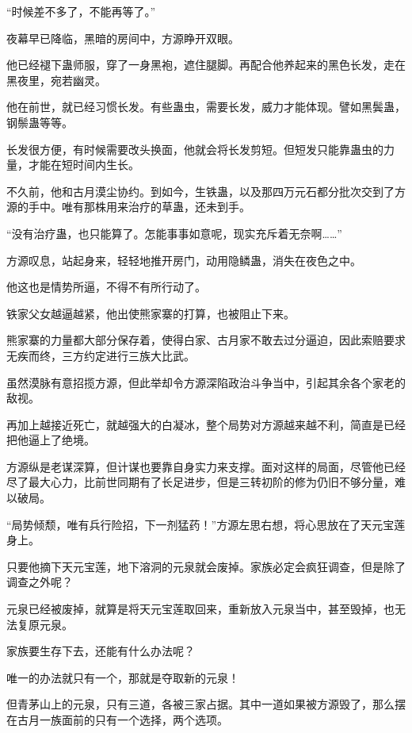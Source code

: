 
\begin{this_body}

“时候差不多了，不能再等了。”

夜幕早已降临，黑暗的房间中，方源睁开双眼。

他已经褪下蛊师服，穿了一身黑袍，遮住腿脚。再配合他养起来的黑色长发，走在黑夜里，宛若幽灵。

他在前世，就已经习惯长发。有些蛊虫，需要长发，威力才能体现。譬如黑鬓蛊，钢鬃蛊等等。

长发很方便，有时候需要改头换面，他就会将长发剪短。但短发只能靠蛊虫的力量，才能在短时间内生长。

不久前，他和古月漠尘协约。到如今，生铁蛊，以及那四万元石都分批次交到了方源的手中。唯有那株用来治疗的草蛊，还未到手。

“没有治疗蛊，也只能算了。怎能事事如意呢，现实充斥着无奈啊……”

方源叹息，站起身来，轻轻地推开房门，动用隐鳞蛊，消失在夜色之中。

他这也是情势所逼，不得不有所行动了。

铁家父女越逼越紧，他出使熊家寨的打算，也被阻止下来。

熊家寨的力量都大部分保存着，使得白家、古月家不敢去过分逼迫，因此索赔要求无疾而终，三方约定进行三族大比武。

虽然漠脉有意招揽方源，但此举却令方源深陷政治斗争当中，引起其余各个家老的敌视。

再加上越接近死亡，就越强大的白凝冰，整个局势对方源越来越不利，简直是已经把他逼上了绝境。

方源纵是老谋深算，但计谋也要靠自身实力来支撑。面对这样的局面，尽管他已经尽了最大心力，比前世同期有了长足进步，但是三转初阶的修为仍旧不够分量，难以破局。

“局势倾颓，唯有兵行险招，下一剂猛药！”方源左思右想，将心思放在了天元宝莲身上。

只要他摘下天元宝莲，地下溶洞的元泉就会废掉。家族必定会疯狂调查，但是除了调查之外呢？

元泉已经被废掉，就算是将天元宝莲取回来，重新放入元泉当中，甚至毁掉，也无法复原元泉。

家族要生存下去，还能有什么办法呢？

唯一的办法就只有一个，那就是夺取新的元泉！

但青茅山上的元泉，只有三道，各被三家占据。其中一道如果被方源毁了，那么摆在古月一族面前的只有一个选择，两个选项。


\end{this_body}
